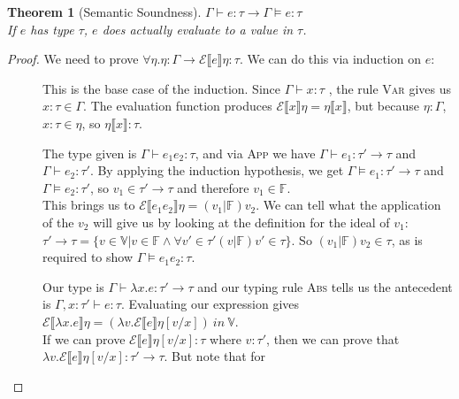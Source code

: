 \newtheorem{theorem}{Theorem}
\begin{theorem}[Semantic Soundness]
  $\Gamma \vdash e : \tau \rightarrow \Gamma \vDash e : \tau$ \\
  If $e$ has type $\tau$, $e$ does actually evaluate to a value in $\tau$.
\end{theorem}
\begin{proof}
  We need to prove $\forall \eta. \eta : \Gamma \rightarrow \mathcal{E} \llbracket e \rrbracket \eta : \tau$. We can do
  this via induction on $e$:

  \begin{description}
  \item[] This is the base case of the induction. Since
    $\Gamma \vdash x : \tau$ , the rule \textsc{Var} gives us
    $x : \tau \in \Gamma$. The evaluation function produces
    $\mathcal{E} \llbracket x \rrbracket \eta = \eta \llbracket x \rrbracket$, but because
    $\eta : \Gamma$, $x : \tau \in \eta$, so $\eta \llbracket x \rrbracket : \tau$.
  \item[] The type given is
    $\Gamma \vdash e_1 e_2 : \tau$, and via \textsc{App} we have
    $\Gamma \vdash e_1 : \tau' \rightarrow \tau$ and
    $\Gamma \vdash e_2 : \tau'$.  By applying the induction hypothesis, we get
    $\Gamma \vDash e_1 : \tau' \rightarrow \tau$ and $\Gamma \vDash e_2 : \tau'$, so
    $v_1 \in \tau' \rightarrow \tau$ and therefore $v_1 \in \mathbb{F}$. \\
    This brings us to
    $\mathcal{E} \llbracket e_1 e_2 \rrbracket \eta = (v_1 | \mathbb{F}) v_2$. We can tell
    what the application of the $v_2$ will give us by looking at the
    definition for the ideal of $v_1$:
    ${\tau' \rightarrow \tau = \{ v \in \mathbb{V} | v \in \mathbb{F} \wedge \forall v' \in \tau' (v |
      \mathbb{F}) v' \in \tau \}}$.  So
    $(v_1 | \mathbb{F}) v_2 \in \tau$, as is required to show
    $\Gamma \vDash e_1 e_2 : \tau$.
  \item[] Our type is
    $\Gamma \vdash \lambda x . e : \tau' \rightarrow \tau$ and our typing rule \textsc{Abs} tells us
    the antecedent is $\Gamma,x:\tau' \vdash e :
    \tau$. Evaluating our expression gives
    $\mathcal{E} \llbracket \lambda x . e \rrbracket \eta = (\lambda v. \mathcal{E} \llbracket e \rrbracket \eta[v / x]) \
    in \ \mathbb{V}$. \\
    If we can prove
    $\mathcal{E} \llbracket e \rrbracket \eta [v/x] : \tau$ where
    $v : \tau'$, then we can prove that
    ${\lambda v . \mathcal{E} \llbracket e \rrbracket \eta [v/x] : \tau' \rightarrow \tau}$. But note that for

\end{description}
\end{proof}
